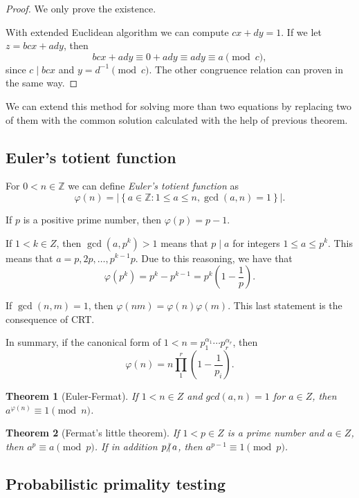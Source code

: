 \documentclass{article}
\newcommand{\Z}{\mathbb{Z}}
\newcommand{\nmid}{\hspace{-4pt}\not|\hspace{2pt}}
\newtheorem{theorem}{Theorem}
\begin{document}
\begin{proof}
    We only prove the existence.

    With extended Euclidean algorithm we can compute $cx + dy = 1$.
    If we let $z = bcx + ady$, then
    \[
        bcx + ady \equiv 0 + ady \equiv ady \equiv a \pmod{c},
    \]
    since $c \mid bcx$ and $y=d^{-1} \pmod{c}$.
    The other congruence relation can proven in the same way.
\end{proof}

We can extend this method for solving more than two equations by replacing two of them with the common solution calculated with the help of previous theorem.

\subsection{Euler's totient function}

For $0 < n \in \Z$ we can define \emph{Euler's totient function} as
\[
    \varphi(n)  = \left \lvert \left \{ a \in \Z : 1 \le a \le n, \gcd(a,n) = 1 \right \} \right \rvert.
\]

If $p$ is a positive prime number, then $\varphi(p) = p - 1$.

If $1 < k \in Z$, then $\gcd(a, p^k) > 1$ means that $p \mid a$ for integers $1 \le a \le p^k$.
This means that $a = p, 2p, \dots, p^{k-1}p$. Due to this reasoning, we have that
\[
    \varphi\left( p^k \right) = p^k - p^{k-1} = p^k \left( 1 - \frac{1}{p} \right).
\]

If $\gcd(n,m)=1$, then $\varphi(nm) = \varphi(n)\varphi(m)$. This last statement is the consequence of CRT.

In summary, if the canonical form of $1 < n = p_1^{\alpha_1}\cdots p_r^{\alpha_r}$, then
\[
    \varphi(n) = n \prod_{1}^{r} \left( 1 - \frac{1}{p_i} \right).
\]

\begin{theorem}[Euler-Fermat]
    If $1 < n \in Z$ and $gcd(a,n) = 1$ for $a \in Z$, then $a^{\varphi(n)} \equiv 1 \pmod{n}$.
\end{theorem}

\begin{theorem}[Fermat's little theorem]
    If $1 < p \in Z$ is a prime number and $a \in Z$, then $a^{p} \equiv a \pmod{p}$. If in addition $p \nmid a$, then $a^{p-1} \equiv 1 \pmod{p}$.
\end{theorem}

\subsection{Probabilistic primality testing}
\end{document}
